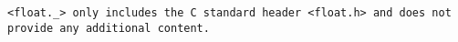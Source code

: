 \tt{<float._>} only includes the C standard header
\tt{<float.h>} and does not provide any additional content.
